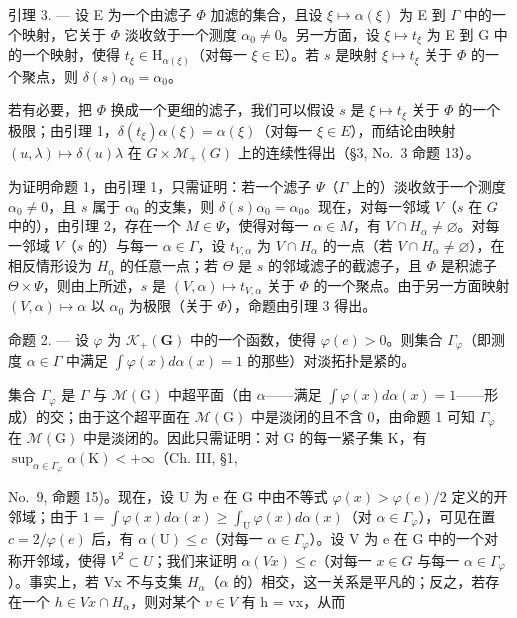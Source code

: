 引理 3. --- 设 E 为一个由滤子 \(\Phi\) 加滤的集合，且设 \(\xi \mapsto \alpha(\xi)\) 为 E 到 \(\Gamma\) 中的一个映射，它关于 \(\Phi\) 淡收敛于一个测度 \(\alpha_0 \neq 0\)。另一方面，设 \(\xi \mapsto t_{\xi}\) 为 E 到 G 中的一个映射，使得 \(t_{\xi} \in \mathrm{H}_{\alpha(\xi)}\)（对每一 \(\xi \in \mathrm{E}\)）。若 \(s\) 是映射 \(\xi \mapsto t_{\xi}\) 关于 \(\Phi\) 的一个聚点，则 \(\delta(s)\alpha_0 = \alpha_0\)。

若有必要，把 \(\Phi\) 换成一个更细的滤子，我们可以假设 \(s\) 是 \(\xi \mapsto t_{\xi}\) 关于 \(\Phi\) 的一个极限；由引理 1，\(\delta(t_{\xi})\alpha(\xi) = \alpha(\xi)\)（对每一 \(\xi \in E\)），而结论由映射 \((u,\lambda) \mapsto \delta(u)\lambda\) 在 \(G \times \mathcal{M}_{+}(G)\) 上的连续性得出（§3, No.~3 命题 13）。

为证明命题 1，由引理 1，只需证明：若一个滤子 \(\Psi\)（\(\Gamma\) 上的）淡收敛于一个测度 \(\alpha_0 \neq 0\)，且 \(s\) 属于 \(\alpha_0\) 的支集，则 \(\delta(s)\alpha_0 = \alpha_0\)。现在，对每一邻域 \(V\)（\(s\) 在 \(G\) 中的），由引理 2，存在一个 \(M \in \Psi\)，使得对每一 \(\alpha \in M\)，有 \(V \cap H_\alpha \neq \varnothing\)。对每一邻域 \(V\)（\(s\) 的）与每一 \(\alpha \in \Gamma\)，设 \(t_{V,\alpha}\) 为 \(V \cap H_\alpha\) 的一点（若 \(V \cap H_\alpha \neq \varnothing\)），在相反情形设为 \(H_\alpha\) 的任意一点；若 \(\Theta\) 是 \(s\) 的邻域滤子的截滤子，且 \(\Phi\) 是积滤子 \(\Theta \times \Psi\)，则由上所述，\(s\) 是 \((V,\alpha) \mapsto t_{V,\alpha}\) 关于 \(\Phi\) 的一个聚点。由于另一方面映射 \((V,\alpha) \mapsto \alpha\) 以 \(\alpha_0\) 为极限（关于 \(\Phi\)），命题由引理 3 得出。

命题 2. --- 设 \(\varphi\) 为 \(\mathcal{K}_{+}(\mathbf{G})\) 中的一个函数，使得 \(\varphi(e) > 0\)。则集合 \(\Gamma_{\varphi}\)（即测度 \(\alpha \in \Gamma\) 中满足 \(\int \varphi(x) d\alpha(x) = 1\) 的那些）对淡拓扑是紧的。

集合 \(\Gamma_{\varphi}\) 是 \(\Gamma\) 与 \(\mathcal{M}(\mathrm{G})\) 中超平面（由 \(\alpha\)——满足 \(\int \varphi(x)d\alpha(x)=1\)——形成）的交；由于这个超平面在 \(\mathcal{M}(\mathrm{G})\) 中是淡闭的且不含 0，由命题 1 可知 \(\Gamma_{\varphi}\) 在 \(\mathcal{M}(\mathrm{G})\) 中是淡闭的。因此只需证明：对 G 的每一紧子集 K，有 \(\sup_{\alpha\in\Gamma_{\varphi}}\alpha(\mathrm{K})<+\infty\)（Ch. III, §1,

No.~9, 命题 15)。现在，设 U 为 e 在 G 中由不等式 \(\varphi(x) > \varphi(e)/2\) 定义的开邻域；由于 \(1 = \int \varphi(x) d\alpha(x) \geqslant \int_{\mathrm{U}} \varphi(x) d\alpha(x)\)（对 \(\alpha \in \Gamma_{\varphi}\)），可见在置 \(c = 2/\varphi(e)\) 后，有 \(\alpha(\mathrm{U}) \leqslant c\)（对每一 \(\alpha \in \Gamma_{\varphi}\)）。设 V 为 e 在 G 中的一个对称开邻域，使得 \(V^{2} \subset U\)；我们来证明 \(\alpha(Vx) \leqslant c\)（对每一 \(x \in G\) 与每一 \(\alpha \in \Gamma_{\varphi}\)）。事实上，若 Vx 不与支集 \(H_{\alpha}\)（\(\alpha\) 的）相交，这一关系是平凡的；反之，若存在一个 \(h \in Vx \cap H_{\alpha}\)，则对某个 \(v \in V\) 有 h = vx，从而

